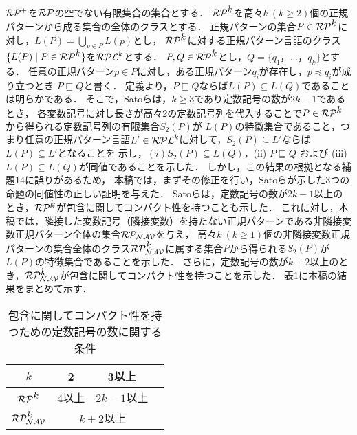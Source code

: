 $\mathcal{RP^{+}}$を$\mathcal{RP}$の空でない有限集合の集合とする．
$\mathcal{RP^{\mbox{$k$}}}$を高々$k~(k\geq 2)$個の正規パターンから成る集合の全体のクラスとする．
正規パターンの集合$P\in\mathcal{RP^{\mbox{$k$}}}$に対し，$L(P)=\bigcup_{p\in P}L(p)$とし，
$\mathcal{RP^{\mbox{$k$}}}$に対する正規パターン言語のクラス$\{L(P) \mid P\in \mathcal{RP^{\mbox{$k$}}}\}$を$\mathcal{RPL}^{k}$とする．
$P,Q\in \mathcal{RP^{\mbox{$k$}}}$とし，$Q= \{ q_{1}，\ldots ，q_{k} \}$とする．
任意の正規パターン$p\in P$に対し，ある正規パターン$q_{i}$が存在し，$p\preceq q_{i}$が成り立つとき
$P\sqsubseteq Q$と書く．
定義より，$P \sqsubseteq Q$ならば$L(P)\subseteq L(Q)$であることは明らかである．
そこで，Satoら\cite{Sato1}は，$k \ge 3$であり定数記号の数が$2k-1$であるとき，
各変数記号に対し長さが高々2の定数記号列を代入することで$P\in \mathcal{RP^{\mbox{$k$}}}$から得られる定数記号列の有限集合$S_2(P)$が
$L(P)$の特徴集合であること，つまり任意の正規パターン言語$L'\in \mathcal{RPL}^{k}$に対して，$S_2(P) \subseteq L'$ならば$L(P)\subseteq L'$となることを
示し，$(i) S_2(P) \subseteq L(Q)$，(ii) $P\sqsubseteq Q$ および (iii) $L(P)\subseteq L(Q)$が同値であることを示した．
しかし，この結果の根拠となる補題14\cite{Sato1}に誤りがあるため，
本稿では，まずその修正を行い，Satoらが示した3つの命題の同値性の正しい証明を与えた．
Satoら\cite{Sato1}は，定数記号の数が$2k-1$以上のとき，$\mathcal{RP^{\mbox{$k$}}}$が包含に関してコンパクト性を持つことも示した．
これに対し，本稿では，隣接した変数記号（隣接変数）を持たない正規パターンである非隣接変数正規パターン全体の集合$\mathcal{RP_{NAV}}$を与え，
高々$k~(k\ge 1)$個の非隣接変数正規パターンの集合全体のクラス$\mathcal{RP^{\mbox{$k$}}_{NAV}}$に属する集合$P$から得られる$S_2(P)$が$L(P)$の特徴集合であることを示した．
さらに，定数記号の数が$k+2$以上のとき，$\mathcal{RP^{\mbox{$k$}}_{NAV}}$が包含に関してコンパクト性を持つことを示した．
表\ref{表1}に本稿の結果をまとめて示す．
\begin{table}
	\begin{center}
	\caption{包含に関してコンパクト性を持つための定数記号の数に関する条件}
	\label{表1}
	\begin{tabular}{llll}
	\hline
	\multicolumn{1}{|c|}{$k$}   & \multicolumn{1}{c|}{2}                            & \multicolumn{1}{c|}{3以上} \\ 
	\hline
	\hline
	\multicolumn{1}{|c|}{$\mathcal{RP^{\mbox{$k$}}}$} & \multicolumn{1}{c|}{4以上}                          & \multicolumn{1}{c|}{$2k-1$以上} \\ \hline
	\multicolumn{1}{|c|}{$\mathcal{RP^{\mbox{$k$}}_{NAV}}$} & \multicolumn{2}{c|}{$k+2$以上} \\ \hline
	\end{tabular}
	\end{center}
	\end{table}

